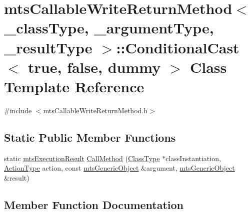 \hypertarget{classmts_callable_write_return_method_1_1_conditional_cast_3_01true_00_01false_00_01dummy_01_4}{}\section{mts\+Callable\+Write\+Return\+Method$<$ \+\_\+class\+Type, \+\_\+argument\+Type, \+\_\+result\+Type $>$\+:\+:Conditional\+Cast$<$ true, false, dummy $>$ Class Template Reference}
\label{classmts_callable_write_return_method_1_1_conditional_cast_3_01true_00_01false_00_01dummy_01_4}


{\ttfamily \#include $<$mts\+Callable\+Write\+Return\+Method.\+h$>$}

\subsection*{Static Public Member Functions}
\begin{DoxyCompactItemize}
\item 
static \hyperlink{classmts_execution_result}{mts\+Execution\+Result} \hyperlink{classmts_callable_write_return_method_1_1_conditional_cast_3_01true_00_01false_00_01dummy_01_4_a983b6fc895950636c1d6c2f887d14d80}{Call\+Method} (\hyperlink{classmts_callable_write_return_method_a51dbe6298941ab172d83182c8188092d}{Class\+Type} $\ast$class\+Instantiation, \hyperlink{classmts_callable_write_return_method_a650562eae4db20a5cfbbff0f9f7e1a0a}{Action\+Type} action, const \hyperlink{classmts_generic_object}{mts\+Generic\+Object} \&argument, \hyperlink{classmts_generic_object}{mts\+Generic\+Object} \&result)
\end{DoxyCompactItemize}


\subsection{Member Function Documentation}
\hypertarget{classmts_callable_write_return_method_1_1_conditional_cast_3_01true_00_01false_00_01dummy_01_4_a983b6fc895950636c1d6c2f887d14d80}{}
